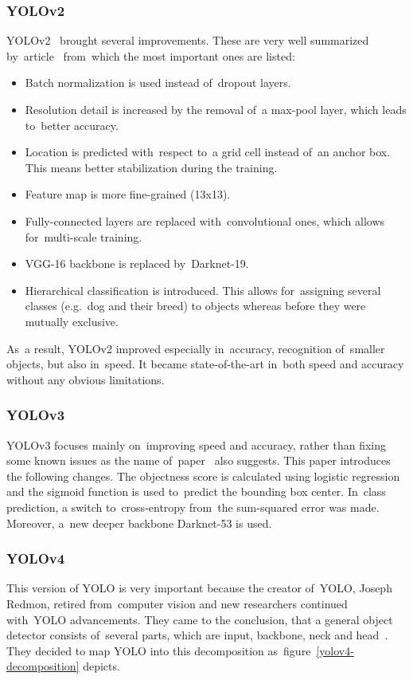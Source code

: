 \subsubsection{YOLOv2}

YOLOv2~\cite{yolov2} brought several improvements. These are very well summarized by~article~\cite{yolo-evolution} from~which the most important ones are listed:

\begin{itemize}[topsep=0pt,itemsep=-1.5pt,partopsep=6pt]
    \item Batch normalization is used instead of~dropout layers.
    \item Resolution detail is increased by the removal of~a max-pool layer, which leads to~better accuracy.
    \item Location is predicted with~respect to~a grid cell instead of~an anchor box. This means better stabilization during the training.
    \item Feature map is more fine-grained (13x13).
    \item Fully-connected layers are replaced with~convolutional ones, which allows for~multi-scale training.
    \item VGG-16 backbone is replaced by~Darknet-19.
    \item Hierarchical classification is introduced. This allows for~assigning several classes (e.g.~dog and their breed) to objects whereas before they were mutually exclusive.
\end{itemize}

As~a result, YOLOv2 improved especially in~accuracy, recognition of~smaller objects, but also in~speed. It became state-of-the-art in~both speed and accuracy without any obvious limitations.

\subsubsection{YOLOv3}
YOLOv3 focuses mainly on~improving speed and accuracy, rather than fixing some known issues as the name of~paper~\cite{yolov3}  also suggests. This paper introduces the following changes. The objectness score is calculated using logistic regression and the sigmoid function is used to~predict the bounding box center. In~class prediction, a switch to~cross-entropy from~the sum-squared error was made. Moreover, a~new deeper backbone Darknet-53 is used.

\subsubsection{YOLOv4}
This version of YOLO is very important because the creator of~YOLO, Joseph Redmon, retired from~computer vision and new researchers continued with~YOLO advancements. They came to the conclusion, that a general object detector consists of~several parts, which are input, backbone, neck and head~\cite{yolov4}. They decided to map YOLO into this decomposition as~figure~\ref{yolov4-decomposition} depicts.

